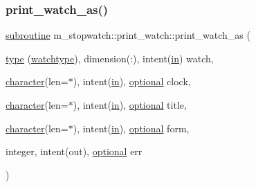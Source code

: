 \subsubsection{\texorpdfstring{print\+\_\+watch\+\_\+as()}{print\_watch\_as()}}
{\footnotesize\ttfamily \hyperlink{M__stopwatch_83_8txt_acfbcff50169d691ff02d4a123ed70482}{subroutine} m\+\_\+stopwatch\+::print\+\_\+watch\+::print\+\_\+watch\+\_\+as (\begin{DoxyParamCaption}\item[{\hyperlink{stop__watch_83_8txt_a70f0ead91c32e25323c03265aa302c1c}{type} (\hyperlink{structm__stopwatch_1_1watchtype}{watchtype}), dimension(\+:), intent(\hyperlink{M__journal_83_8txt_afce72651d1eed785a2132bee863b2f38}{in})}]{watch,  }\item[{\hyperlink{option__stopwatch_83_8txt_abd4b21fbbd175834027b5224bfe97e66}{character}(len=$\ast$), intent(\hyperlink{M__journal_83_8txt_afce72651d1eed785a2132bee863b2f38}{in}), \hyperlink{option__stopwatch_83_8txt_aa4ece75e7acf58a4843f70fe18c3ade5}{optional}}]{clock,  }\item[{\hyperlink{option__stopwatch_83_8txt_abd4b21fbbd175834027b5224bfe97e66}{character}(len=$\ast$), intent(\hyperlink{M__journal_83_8txt_afce72651d1eed785a2132bee863b2f38}{in}), \hyperlink{option__stopwatch_83_8txt_aa4ece75e7acf58a4843f70fe18c3ade5}{optional}}]{title,  }\item[{\hyperlink{option__stopwatch_83_8txt_abd4b21fbbd175834027b5224bfe97e66}{character}(len=$\ast$), intent(\hyperlink{M__journal_83_8txt_afce72651d1eed785a2132bee863b2f38}{in}), \hyperlink{option__stopwatch_83_8txt_aa4ece75e7acf58a4843f70fe18c3ade5}{optional}}]{form,  }\item[{integer, intent(out), \hyperlink{option__stopwatch_83_8txt_aa4ece75e7acf58a4843f70fe18c3ade5}{optional}}]{err }\end{DoxyParamCaption})\hspace{0.3cm}{\ttfamily [private]}}

\mbox{\label{interfacem__stopwatch_1_1print__watch_ac586abdc1e5871d952e4f97fe1fa83ca}} 
